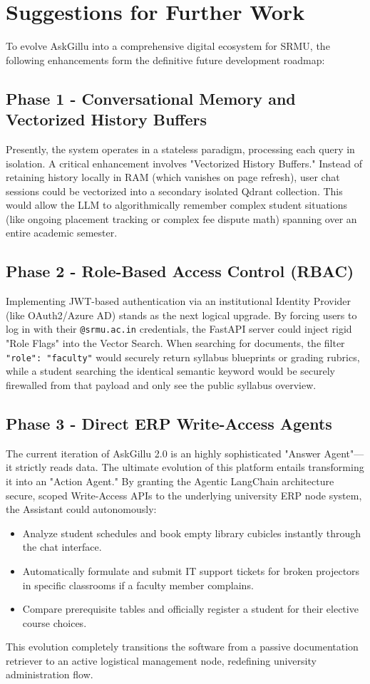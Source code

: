 \documentclass[12pt,a4paper]{report}
\begin{document}
\section{Suggestions for Further Work}
To evolve AskGillu into a comprehensive digital ecosystem for SRMU, the following enhancements form the definitive future development roadmap:

\subsection{Phase 1 - Conversational Memory and Vectorized History Buffers}
Presently, the system operates in a stateless paradigm, processing each query in isolation. A critical enhancement involves "Vectorized History Buffers." Instead of retaining history locally in RAM (which vanishes on page refresh), user chat sessions could be vectorized into a secondary isolated Qdrant collection. This would allow the LLM to algorithmically remember complex student situations (like ongoing placement tracking or complex fee dispute math) spanning over an entire academic semester.

\subsection{Phase 2 - Role-Based Access Control (RBAC)}
Implementing JWT-based authentication via an institutional Identity Provider (like OAuth2/Azure AD) stands as the next logical upgrade. By forcing users to log in with their \texttt{@srmu.ac.in} credentials, the FastAPI server could inject rigid "Role Flags" into the Vector Search. When searching for documents, the filter \texttt{"role": "faculty"} would securely return syllabus blueprints or grading rubrics, while a student searching the identical semantic keyword would be securely firewalled from that payload and only see the public syllabus overview.

\subsection{Phase 3 - Direct ERP Write-Access Agents}
The current iteration of AskGillu 2.0 is an highly sophisticated "Answer Agent"---it strictly reads data. The ultimate evolution of this platform entails transforming it into an "Action Agent." By granting the Agentic LangChain architecture secure, scoped Write-Access APIs to the underlying university ERP node system, the Assistant could autonomously:
\begin{itemize}
    \item Analyze student schedules and book empty library cubicles instantly through the chat interface.
    \item Automatically formulate and submit IT support tickets for broken projectors in specific classrooms if a faculty member complains.
    \item Compare prerequisite tables and officially register a student for their elective course choices.
\end{itemize}
This evolution completely transitions the software from a passive documentation retriever to an active logistical management node, redefining university administration flow.
\end{document}
